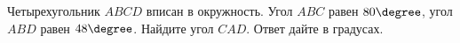 \begin{ex}
	\begin{condition}
		Четырехугольник \( ABCD  \) вписан в окружность. Угол \( ABC  \) равен \( 80  \degree\), угол \( ABD  \) равен \( 48  \degree\). Найдите угол \( CAD \). Ответ дайте в градусах. 
	\end{condition}
\end{ex}